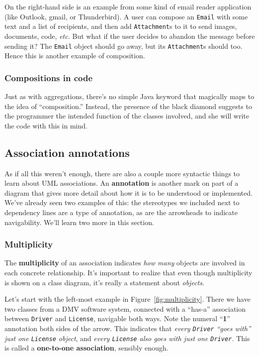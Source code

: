 On the right-hand side is an example from some kind of email reader
application (like Outlook, gmail, or Thunderbird). A user can compose an
\texttt{Email} with some text and a list of recipients, and then add
\texttt{Attachment}s to it to send images, documents, code, \textit{etc.} But
what if the user decides to abandon the message before sending it? The
\texttt{Email} object should go away, but its \texttt{Attachment}s should too.
Hence this is another example of composition.

\subsubsection{Compositions in code}

Just as with aggregations, there's no simple Java keyword that magically maps
to the idea of ``composition.'' Instead, the presence of the black diamond
suggests to the programmer the intended function of the classes involved, and
she will write the code with this in mind.


\subsection{Association annotations}

As if all this weren't enough, there are also a couple more syntactic things
to learn about UML associations. An \textbf{annotation} is another mark on
part of a diagram that gives more detail about how it is to be understood or
implemented. We've already seen two examples of this: the stereotypes we
included next to dependency lines are a type of annotation, as are the
arrowheads to indicate navigability. We'll learn two more in this section.

\subsubsection{Multiplicity}

The \textbf{multiplicity} of an association indicates \textit{how many}
objects are involved in each concrete relationship. It's important to realize
that even though multiplicity is shown on a class diagram, it's really a
statement about \textit{objects}.

Let's start with the left-most example in Figure~\ref{fig:multiplicity}. There
we have two classes from a DMV software system, connected with a ``has-a''
association between \texttt{Driver} and \texttt{License}, navigable both ways.
Note the numeral ``\textbf{1}'' annotation both sides of the arrow. This
indicates that \textit{every \texttt{Driver} ``goes with'' just one
\texttt{License} object}, and \textit{every \texttt{License} also goes with
just one \texttt{Driver}.} This is called a \textbf{one-to-one association},
sensibly enough.

